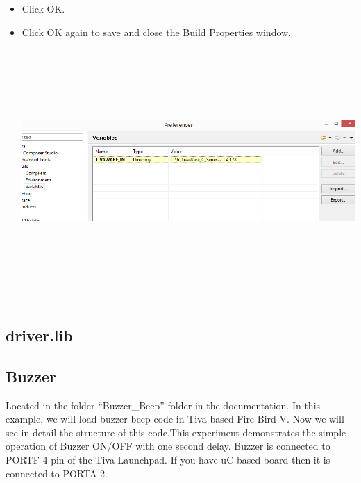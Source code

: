 \documentclass[a4paper,10pt,oneside]{article}
\begin{document}
\begin{itemize}
						\item  Click OK.
						\item  Click OK again to save and close
						the Build Properties window.\\
						\includegraphics[width=20cm,height=10cm]{AddVariables9}
					\end{itemize}
		\subsection{\huge \textbf{driver.lib}}
		\subsection{\huge \textbf{Buzzer}}
		
			Located in the folder “Buzzer\_Beep” folder in the documentation.
			In this example, we will load buzzer beep code in Tiva based Fire Bird V. Now we will see in detail the structure of this code.This experiment demonstrates the simple operation of Buzzer ON/OFF with one second delay.
			Buzzer is connected to PORTF 4 pin of the Tiva Launchpad. If you have uC based board then it is connected to PORTA 2.
		
\end{document}

